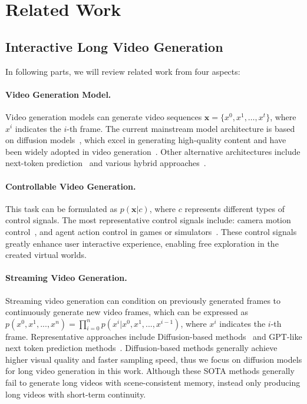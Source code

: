 \section{Related Work}
\subsection{Interactive Long Video Generation}
In following parts, we will review related work from four aspects:

\paragraph{Video Generation Model.} Video generation models can generate video sequences $\mathbf{x} = \{ x^0, x^1, \dots, x^t\}$, where $x^i$ indicates the $i$-th frame. The current mainstream model architecture is based on diffusion models~\cite{ddpm, sde, score,flow,rectified}, which excel in generating high-quality content and have been widely adopted in video generation~\cite{sora,cogvideox,kling,veo2,runway,vidu,wan,hunyuanvideo}. Other alternative architectures include next-token prediction~\cite{videogpt,videopoet,emu3} and various hybrid approaches~\cite{cdf,nova,mar}.

\paragraph{Controllable Video Generation.} This task can be formulated as $p(\mathbf{x}|c)$, where $c$ represents different types of control signals. The most representative control signals include: camera motion control~\cite{motionctrl,cameractrl,3dtrajmaster,recammaster, syncammaster}, and agent action control in games or simulators~\cite{gamengine,genie2,gamefactory,matrix,oasis}. These control signals greatly enhance user interactive experience, enabling free exploration in the created virtual worlds.

\paragraph{Streaming Video Generation.} Streaming video generation can condition on previously generated frames to continuously generate new video frames, which can be expressed as $p(x^0,x^1,...,x^n)=\prod_{i=0}^np(x^i|x^0,x^1,...,x^{i-1})$, where $x^i$ indicates the $i$-th frame. Representative approaches include Diffusion-based methods~\cite{cdf,dfot,gamefactory,far,framepack} and GPT-like next token prediction methods~\cite{videopoet,emu3,wham}. Diffusion-based methods generally achieve higher visual quality and faster sampling speed, thus we focus on diffusion models for long video generation in this work. Although these SOTA methods generally fail to generate long videos with scene-consistent memory, instead only producing long videos with short-term continuity.


